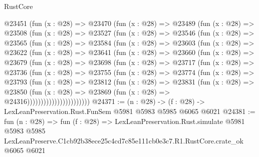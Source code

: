 \begin{lexlean}{RustCore}
\begin{coremodule}
  @23451
    (fun (x : @28) =>
    @23470
      (fun (x : @28) =>
      @23489
        (fun (x : @28) =>
        @23508
          (fun (x : @28) =>
          @23527
            (fun (x : @28) =>
            @23546
              (fun (x : @28) =>
              @23565
                (fun (x : @28) =>
                @23584
                  (fun (x : @28) =>
                  @23603
                    (fun (x : @28) =>
                    @23622
                      (fun (x : @28) =>
                      @23641
                        (fun (x : @28) =>
                        @23660
                          (fun (x : @28) =>
                          @23679
                            (fun (x : @28) =>
                            @23698
                              (fun (x : @28) =>
                              @23717
                                (fun (x : @28) =>
                                @23736
                                  (fun (x : @28) =>
                                  @23755
                                    (fun (x : @28) =>
                                    @23774
                                      (fun (x : @28) =>
                                      @23793
                                        (fun (x : @28) =>
                                        @23812
                                          (fun (x : @28) =>
                                          @23831
                                            (fun (x : @28) =>
                                            @23850
                                              (fun (x : @28) =>
                                              @23869 (fun (x : @28) => @24316)))))))))))))))))))))))
@24371 := (n : @28) -> (f : @28) -> LexLeanPreservation.Rust.FunSem @5981 @5983 @5985 @6065 @6021
@24381 := fun (n : @28) =>
  fun (f : @28) =>
  LexLeanPreservation.Rust.simulate
    @5981
    @5983
    @5985
    LexLeanPreserve.C1cb92b38ece25c4cd7c85e111cb0e3c7.R1.RustCore.crate_ok
    @6065
    @6021
\end{coremodule}
\end{lexlean}
